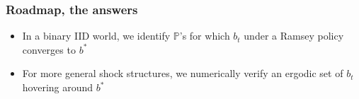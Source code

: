 \documentclass{beamer}
\newcommand{\EE}{\mathbb E}
\begin{document}
\begin{frame}
\frametitle{Roadmap, the answers}


	
	\begin{itemize}
	 \item In a binary IID world, we identify  $\mathbb{P}$'s for which $b_t$  under a Ramsey policy converges to $b^*$	
	
	\item For more general shock structures, we numerically verify  an ergodic set of $b_t$ hovering around $b^*$
	\end{itemize}

	
\end{frame}
%
%
%
%
\end{document}
